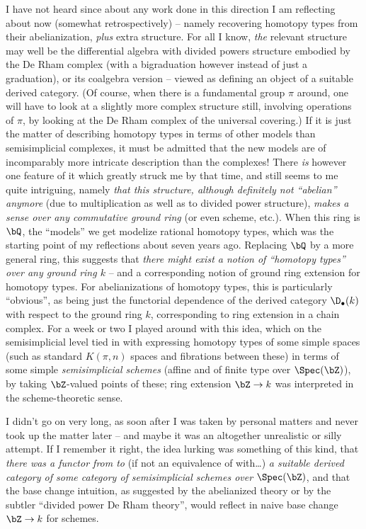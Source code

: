 I have not heard since about any work done in this direction I am
reflecting about now (somewhat retrospectively) -- namely recovering
homotopy types from their abelianization, \emph{plus} extra
structure. For all I know, \emph{the} relevant structure may well be
the differential algebra with divided powers structure embodied by the
De Rham complex (with a bigraduation however instead of just a
graduation), or its coalgebra version -- viewed as defining an object
of a suitable derived category. (Of course, when there is a
fundamental group $\pi$ around, one will have to look at a slightly
more complex structure still, involving operations of $\pi$, by
looking at the De Rham complex of the universal covering.) If it is
just the matter of describing homotopy types in terms of other models
than semisimplicial complexes, it must be admitted that the new models
are of incomparably more intricate description than the complexes!
There \emph{is} however one feature of it which greatly struck me by
that time, and still seems to me quite intriguing, namely \emph{that
  this structure, although definitely not ``abelian'' anymore} (due to
multiplication as well as to divided power structure), \emph{makes a
  sense over any commutative ground ring} (or even scheme, etc.). When
this ring is $\bQ$, the ``models'' we get modelize rational homotopy
types, which was the starting point of my reflections
about seven years ago. Replacing $\bQ$ by a more general ring, this
suggests that \emph{there might exist a notion of ``homotopy types''
  over any ground ring $k$} -- and a corresponding notion of ground
ring extension for homotopy types. For abelianizations of homotopy
types, this is particularly ``obvious'', as being just the functorial
dependence of the derived category $\D_\bullet(k)$ with respect to the
ground ring $k$, corresponding to ring extension in a chain
complex. For a week or two I played around with this idea, which on
the semisimplicial level tied in with expressing homotopy types of
some simple spaces (such as standard $K(\pi,n)$ spaces and fibrations
between these) in terms of some simple \emph{semisimplicial schemes}
(affine and of finite type over $\Spec(\bZ)$), by taking $\bZ$-valued
points of these; ring extension $\bZ\to k$ was interpreted in the
scheme-theoretic sense.

I didn't go on very long, as soon after I was taken by personal
matters and never took up the matter later -- and maybe it was an
altogether unrealistic or silly attempt. If I remember it right, the
idea lurking was something of this kind, that \emph{there was a
  functor from \Hot{} to} (if not an equivalence of \Hot{} with\ldots)
\emph{a suitable derived category of some category of semisimplicial
  schemes over} $\Spec(\bZ)$, and that the base change intuition, as
suggested by the abelianized theory or by the subtler ``divided power
De Rham theory'', would reflect in naive base change $\bZ\to k$ for
schemes.

